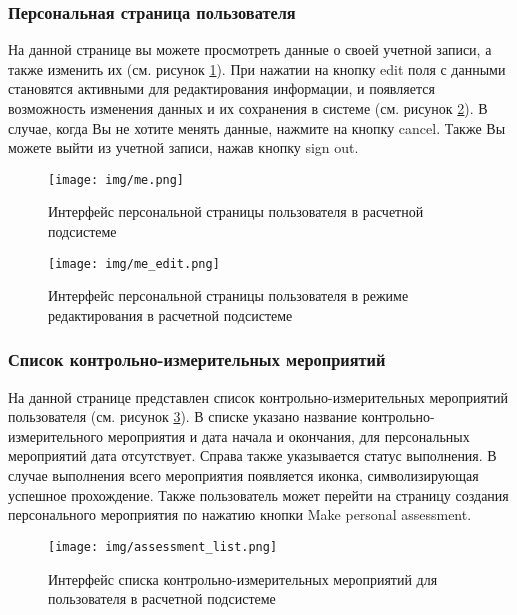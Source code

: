 \documentclass[a4paper,12pt,reqno]{article}
\begin{document}
    \subsubsection{Персональная страница пользователя}

    На данной странице вы можете просмотреть данные о своей учетной записи, а также изменить их (см. рисунок \ref{pic:me}). При нажатии на кнопку edit поля с данными становятся активными для редактирования информации, и появляется возможность изменения данных и их сохранения в системе (см. рисунок \ref{pic:me_edit}). В случае, когда Вы не хотите менять данные, нажмите на кнопку cancel. Также Вы можете выйти из учетной записи, нажав кнопку sign out.

    \begin{figure}[H]
        \centering
        \texttt{[image: img/me.png]}
        \caption{Интерфейс персональной страницы пользователя в расчетной подсистеме}
        \label{pic:me}
    \end{figure}

    \begin{figure}[H]
        \centering
        \texttt{[image: img/me\_edit.png]}
        \caption{Интерфейс персональной страницы пользователя в режиме редактирования в расчетной подсистеме}
        \label{pic:me_edit}
    \end{figure}

    \subsubsection{Список контрольно-измерительных мероприятий}
    На данной странице представлен список контрольно-измерительных мероприятий пользователя (см. рисунок \ref{pic:assessment_list}). В списке указано название контрольно-измерительного мероприятия и дата начала и окончания, для персональных мероприятий дата отсутствует. Справа также указывается статус выполнения. В случае выполнения всего мероприятия появляется иконка, символизирующая успешное прохождение. Также пользователь может перейти на страницу создания персонального мероприятия по нажатию кнопки Make personal assessment.

    \begin{figure}[H]
        \centering
        \texttt{[image: img/assessment\_list.png]}
        \caption{Интерфейс списка контрольно-измерительных мероприятий для пользователя в расчетной подсистеме}
        \label{pic:assessment_list}
    \end{figure}
\end{document}
